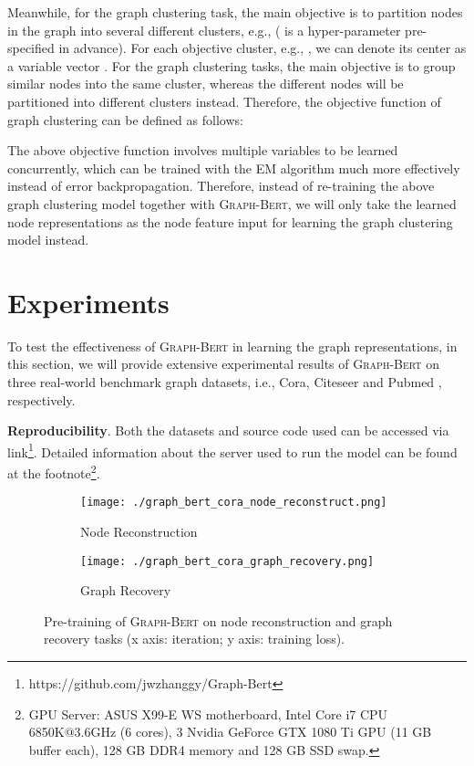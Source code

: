\documentclass{article}
\newcommand{\our}{\textsc{Graph-Bert}}
\begin{document}
Meanwhile, for the graph clustering task, the main objective is to partition nodes in the graph into several different clusters, e.g.,  ( is a hyper-parameter pre-specified in advance). For each objective cluster, e.g., , we can denote its center as a variable vector . For the graph clustering tasks, the main objective is to group similar nodes into the same cluster, whereas the different nodes will be partitioned into different clusters instead. Therefore, the objective function of graph clustering can be defined as follows:

The above objective function involves multiple variables to be learned concurrently, which can be trained with the EM algorithm much more effectively instead of error backpropagation. Therefore, instead of re-training the above graph clustering model together with {\our}, we will only take the learned node representations as the node feature input for learning the graph clustering model instead. 













\section{Experiments}\label{sec:experiment}

To test the effectiveness of {\our} in learning the graph representations, in this section, we will provide extensive experimental results of {\our} on three real-world benchmark graph datasets, i.e., Cora, Citeseer and Pubmed \cite{YCS16}, respectively.

\noindent \textbf{Reproducibility}. Both the datasets and source code used can be accessed via link\footnote{https://github.com/jwzhanggy/Graph-Bert}. Detailed information about the server used to run the model can be found at the footnote\footnote{GPU Server: ASUS X99-E WS motherboard, Intel Core i7 CPU 6850K@3.6GHz (6 cores), 3 Nvidia GeForce GTX 1080 Ti GPU (11 GB buffer each), 128 GB DDR4 memory and 128 GB SSD swap.}.

\begin{figure}
    \centering
    \begin{subfigure}[b]{.23\textwidth}
    	\texttt{[image: ./graph\_bert\_cora\_node\_reconstruct.png]}
    	\caption{Node Reconstruction}\label{fig:acc_train}
    \end{subfigure}\hfill
    \begin{subfigure}[b]{.23\textwidth}
    	\texttt{[image: ./graph\_bert\_cora\_graph\_recovery.png]}
    	\caption{Graph Recovery}\label{fig:acc_test}
    \end{subfigure}\caption{Pre-training of {\our} on node reconstruction and graph recovery tasks (x axis: iteration; y axis: training loss).}\label{fig:graph_bert_pre_train}
\end{figure}
\end{document}
